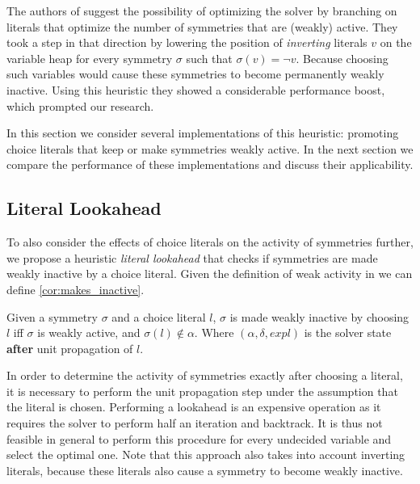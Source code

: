 
The authors of \cite{devriendt2012symmetry,katebi2010symmetry}  suggest the possibility of optimizing the solver by
branching on literals that optimize the number of symmetries that are (weakly) active.
They took a step in that direction by lowering the position of \emph{inverting} literals $v$ on the variable heap for
every symmetry $\sigma$ such that $\sigma(v) = \neg v$.
Because choosing such variables would cause these symmetries to become permanently weakly inactive.
Using this heuristic they showed a considerable performance boost, which prompted our research.

In this section we consider several implementations of this heuristic: promoting choice literals
that keep or make symmetries weakly active.
In the next section we compare the performance of these implementations and discuss their
applicability.

\subsection{Literal Lookahead}
	To also consider the effects of choice literals on the activity of symmetries further,
	we propose a heuristic \emph{literal lookahead} that checks if symmetries are made weakly inactive by a choice literal.
	Given the definition of weak activity in \cite{devriendt2012symmetry} we can define \cref{cor:makes_inactive}.\\

	\begin{corollary}
		\label{cor:makes_inactive}
		Given a symmetry $\sigma$ and a choice literal $l$,
		$\sigma$ is made weakly inactive by choosing $l$ iff
		$\sigma$ is weakly active, and $\sigma(l) \notin \alpha$.
		Where $(\alpha,\delta,\textit{expl})$ is the solver state \textbf{after} unit propagation of $l$. 
	\end{corollary}

	In order to determine the activity of symmetries exactly after choosing a literal,
	it is necessary to perform the unit propagation step under the assumption that the literal is chosen.
	Performing a lookahead is an expensive operation as it requires the solver to perform half an
	iteration and backtrack.
	It is thus not feasible in general to perform this procedure for every undecided variable and
	select the optimal one.
	Note that this approach also takes into account inverting literals,
	because these literals also cause a symmetry to become weakly inactive.
	
